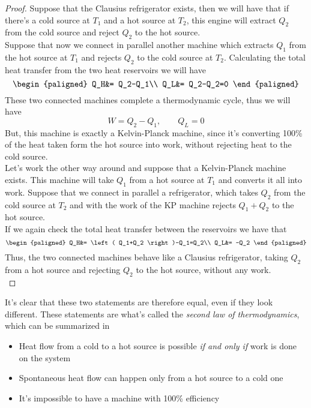 \documentclass[../qm.tex]{subfiles}
\begin{document}
\begin{proof}
	Suppose that the Clausius refrigerator exists, then we will have that if there's a cold source at $T_1$ and a hot source at $T_2$, this engine will extract $Q_2$ from the cold source and reject $Q_2$ to the hot source.\\
	Suppose that now we connect in parallel another machine which extracts $Q_1$ from the hot source at $T_1$ and rejects $Q_2$ to the cold source at $T_2$. Calculating the total heat transfer from the two heat reservoirs we will have
	\begin{equation}
		\begin{paligned}
			Q_H&= Q_2-Q_1\\
			Q_L&= Q_2-Q_2=0
		\end{paligned}
		\label{eq:2nd1stproof.2}
	\end{equation}
	These two connected machines complete a thermodynamic cycle, thus we will have
	\begin{equation*}
		W=Q_2-Q_1, \qquad Q_L=0
	\end{equation*}
	But, this machine is exactly a Kelvin-Planck machine, since it's converting 100\% of the heat taken form the hot source into work, without rejecting heat to the cold source.\\
	Let's work the other way around and suppose that a Kelvin-Planck machine exists. This machine will take $Q_1$ from a hot source at $T_1$ and converts it all into work. Suppose that we connect in parallel a refrigerator, which takes $Q_2$ from the cold source at $T_2$ and with the work of the KP machine rejects $Q_1+Q_2$ to the hot source.\\
	If we again check the total heat transfer between the reservoirs we have that
	\begin{equation}
		\begin{paligned}
			Q_H&= \left( Q_1+Q_2 \right)-Q_1=Q_2\\
			Q_L&= -Q_2
		\end{paligned}
		\label{eq:2nd2ndproof.2}
	\end{equation}
	Thus, the two connected machines behave like a Clausius refrigerator, taking $Q_2$ from a hot source and rejecting $Q_2$ to the hot source, without any work.\\
\end{proof}
It's clear that these two statements are therefore equal, even if they look different. These statements are what's called the \emph{second law of thermodynamics}, which can be summarized in
\begin{itemize}
\item Heat flow from a cold to a hot source is possible \textit{if and only if} work is done on the system
\item Spontaneous heat flow can happen only from a hot source to a cold one
\item It's impossible to have a machine with 100\% efficiency
\end{itemize}
\end{document}
